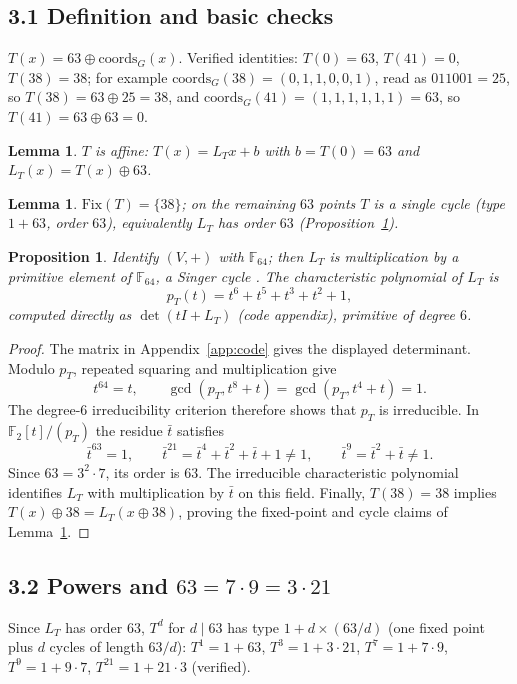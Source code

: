\documentclass[11pt]{article}
\newtheorem{lemma}[theorem]{Lemma}
\newtheorem{proposition}[theorem]{Proposition}
\begin{document}
\subsection*{3.1 Definition and basic checks}
$T(x)=63\oplus \mathrm{coords}_G(x)$. Verified identities:
$T(0)=63$, $T(41)=0$, $T(38)=38$; for example
$\mathrm{coords}_G(38)=(0,1,1,0,0,1)$, read as $011001=25$, so $T(38)=63\oplus25=38$,
and $\mathrm{coords}_G(41)=(1,1,1,1,1,1)=63$, so $T(41)=63\oplus63=0$.
\begin{lemma}\label{lem:aff}
$T$ is affine: $T(x)=L_Tx+b$ with $b=T(0)=63$ and $L_T(x)=T(x)\oplus 63$.
\end{lemma}
\begin{lemma}\label{lem:fix}
$\mathrm{Fix}(T)=\{38\}$; on the remaining $63$ points $T$ is a single cycle
(type $1+63$, order $63$), equivalently $L_T$ has order $63$ (Proposition~\ref{prop:singer}).
\end{lemma}
\begin{proposition}\label{prop:singer}
Identify $(V,+)$ with $\mathbb{F}_{64}$; then $L_T$ is
multiplication by a primitive element of $\mathbb{F}_{64}$, a Singer cycle \cite{LN}. The
characteristic polynomial of $L_T$ is
\begin{equation}\label{eq:pT}
p_T(t)=t^6+t^5+t^3+t^2+1,
\end{equation}
computed directly as $\det(tI+L_T)$ (code appendix), primitive of degree $6$.
\end{proposition}
\begin{proof}
The matrix in Appendix~\ref{app:code} gives the displayed determinant.
Modulo $p_T$, repeated squaring and multiplication give
\[
t^{64}=t,\qquad \gcd(p_T,t^8+t)=\gcd(p_T,t^4+t)=1.
\]
The degree-$6$ irreducibility criterion therefore shows that $p_T$ is
irreducible. In $\mathbb F_2[t]/(p_T)$ the residue $\bar t$ satisfies
\[
\bar t^{63}=1,\qquad
\bar t^{21}=\bar t^4+\bar t^2+\bar t+1\ne1,\qquad
\bar t^9=\bar t^2+\bar t\ne1.
\]
Since $63=3^2\cdot7$, its order is $63$. The irreducible characteristic
polynomial identifies $L_T$ with multiplication by $\bar t$ on this field.
Finally, $T(38)=38$ implies $T(x)\oplus38=L_T(x\oplus38)$, proving
the fixed-point and cycle claims of Lemma~\ref{lem:fix}.
\end{proof}


\subsection*{3.2 Powers and $63=7\cdot 9=3\cdot 21$}
Since $L_T$ has order $63$, $T^d$ for $d\mid 63$ has type $1+d\times(63/d)$ (one fixed point plus $d$ cycles of length $63/d$):
$T^1=1+63$, $T^3=1+3\cdot21$, $T^7=1+7\cdot9$, $T^9=1+9\cdot7$,
$T^{21}=1+21\cdot3$ (verified).
\end{document}
